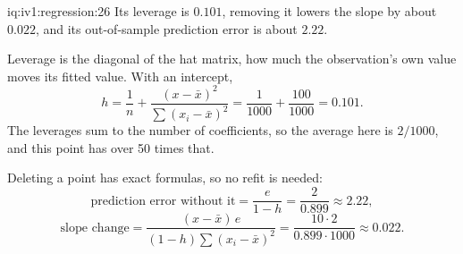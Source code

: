 \begin{solution}{iq:iv1:regression:26}
Its leverage is $0.101$, removing it lowers the slope by about $0.022$, and its out-of-sample prediction error is about $2.22$.

Leverage is the diagonal of the hat matrix, how much the observation's own value moves its fitted value. With an intercept,
\[
h = \frac1n + \frac{(x - \bar x)^2}{\sum (x_i - \bar x)^2} = \frac{1}{1000} + \frac{100}{1000} = 0.101.
\]
The leverages sum to the number of coefficients, so the average here is $2/1000$, and this point has over 50 times that.

Deleting a point has exact formulas, so no refit is needed:
\[
\text{prediction error without it} = \frac{e}{1 - h} = \frac{2}{0.899} \approx 2.22,
\]
\[
\text{slope change} = \frac{(x - \bar x)\,e}{(1 - h)\sum(x_i - \bar x)^2} = \frac{10 \cdot 2}{0.899 \cdot 1000} \approx 0.022.
\]
\end{solution}

